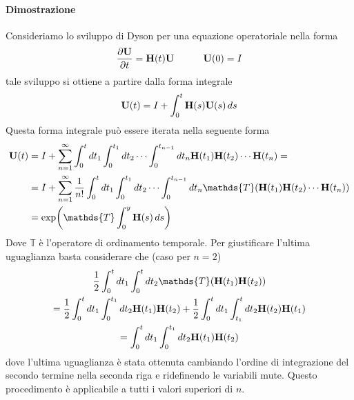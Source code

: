 \documentclass[10pt,a4paper]{article}
\begin{document}
\paragraph{Dimostrazione}
Consideriamo lo sviluppo di Dyson per una equazione operatoriale nella forma
\begin{equation}
	\pdv{\vb{U}}{t} = \vb{H}(t)\vb{U} \quad\quad\quad \vb{U}(0) = I
\end{equation}
tale sviluppo si ottiene a partire dalla forma integrale
\begin{equation}
	\vb{U}(t) = I + \int_0^t \vb{H}(s)\vb{U}(s)\,ds
\end{equation}
Questa forma integrale può essere iterata nella seguente forma
\begin{align}
	\vb{U}(t) &= I + \sum_{n=1}^{\infty}\int_0^t dt_1 \int_0^{t_1} dt_2 \cdots \int_0^{t_{n-1}}dt_n \vb{H}(t_1) \vb{H}(t_2)\cdots \vb{H}(t_n) = \\
	&= I + \sum_{n=1}^{\infty} \frac{1}{n!} \int_0^t dt_1 \int_0^{t_1} dt_2 \cdots \int_0^{t_{n-1}}dt_n \mathds{T}(\vb{H}(t_1) \vb{H}(t_2)\cdots \vb{H}(t_n))\\
	&= \exp(\mathds{T} \int_0^y \vb{H}(s)\,ds)
\end{align}
Dove \(\mathds{T}\) è l'operatore di ordinamento temporale. Per giustificare l'ultima uguaglianza basta considerare che (caso per \(n=2\))
\begin{multline}
	\frac{1}{2} \int_0^t dt_1 \int_0^t dt_2 \mathds{T}(\vb{H}(t_1) \vb{H}(t_2)) \\
	=\frac{1}{2} \int_0^t dt_1 \int_0^{t_1} dt_2 \vb{H}(t_1) \vb{H}(t_2) + \frac{1}{2} \int_0^t dt_1 \int_{t_1}^{t} dt_2 \vb{H}(t_2) \vb{H}(t_1)\\
	=\int_0^t dt_1 \int_0^{t_1} dt_2 \vb{H}(t_1) \vb{H}(t_2)
\end{multline}
dove l'ultima uguaglianza è stata ottenuta cambiando l'ordine di integrazione del secondo termine nella seconda riga e ridefinendo le variabili mute. Questo procedimento è applicabile a tutti i valori superiori di \(n\).
\end{document}
